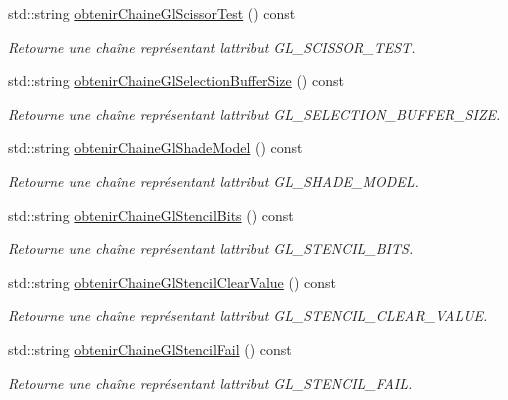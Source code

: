 \begin{DoxyCompactItemize}
std\+::string \hyperlink{group__utilitaire_ga80ed5d63c763521b6db8166033008a6a}{obtenir\+Chaine\+Gl\+Scissor\+Test} () const 
\begin{DoxyCompactList}\small\item\em Retourne une chaîne représentant l\textquotesingle{}attribut G\+L\+\_\+\+S\+C\+I\+S\+S\+O\+R\+\_\+\+T\+E\+S\+T. \end{DoxyCompactList}\item 
std\+::string \hyperlink{group__utilitaire_gae47f276d2d1d8233f544fca09b062e63}{obtenir\+Chaine\+Gl\+Selection\+Buffer\+Size} () const 
\begin{DoxyCompactList}\small\item\em Retourne une chaîne représentant l\textquotesingle{}attribut G\+L\+\_\+\+S\+E\+L\+E\+C\+T\+I\+O\+N\+\_\+\+B\+U\+F\+F\+E\+R\+\_\+\+S\+I\+Z\+E. \end{DoxyCompactList}\item 
std\+::string \hyperlink{group__utilitaire_gaef3c863fd714bcd6607a7fe129c6c1d4}{obtenir\+Chaine\+Gl\+Shade\+Model} () const 
\begin{DoxyCompactList}\small\item\em Retourne une chaîne représentant l\textquotesingle{}attribut G\+L\+\_\+\+S\+H\+A\+D\+E\+\_\+\+M\+O\+D\+E\+L. \end{DoxyCompactList}\item 
std\+::string \hyperlink{group__utilitaire_ga9001f71cc6ac9cb771d5e9eeedd69c5a}{obtenir\+Chaine\+Gl\+Stencil\+Bits} () const 
\begin{DoxyCompactList}\small\item\em Retourne une chaîne représentant l\textquotesingle{}attribut G\+L\+\_\+\+S\+T\+E\+N\+C\+I\+L\+\_\+\+B\+I\+T\+S. \end{DoxyCompactList}\item 
std\+::string \hyperlink{group__utilitaire_ga0949a92c39c09a594a65cb035d992baf}{obtenir\+Chaine\+Gl\+Stencil\+Clear\+Value} () const 
\begin{DoxyCompactList}\small\item\em Retourne une chaîne représentant l\textquotesingle{}attribut G\+L\+\_\+\+S\+T\+E\+N\+C\+I\+L\+\_\+\+C\+L\+E\+A\+R\+\_\+\+V\+A\+L\+U\+E. \end{DoxyCompactList}\item 
std\+::string \hyperlink{group__utilitaire_ga3022225d3598456c739303b98e9d6ff8}{obtenir\+Chaine\+Gl\+Stencil\+Fail} () const 
\begin{DoxyCompactList}\small\item\em Retourne une chaîne représentant l\textquotesingle{}attribut G\+L\+\_\+\+S\+T\+E\+N\+C\+I\+L\+\_\+\+F\+A\+I\+L. \end{DoxyCompactList}\item 

\end{DoxyCompactItemize}
